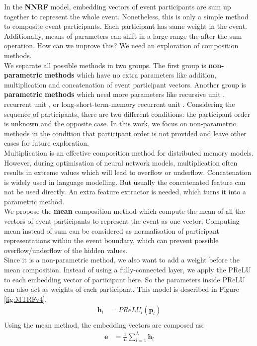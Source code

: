 \documentclass[a4paper]{article}
\begin{document}
In the \textbf{NNRF} model, embedding vectors of event participants are sum up together to represent the whole event. Nonetheless, this is only a simple method to composite event participants. Each participant has same weight in the event. Additionally, means of parameters can shift in a large range the after the sum operation. How can we improve this? We need an exploration of composition methods. \\
We separate all possible methods in two groups. The first group is \textbf{non-parametric methods} which have no extra parameters like addition, multiplication and concatenation of event participant vectors. Another group is \textbf{parametric methods} which need more parameters like recursive unit \citep{socher2013recursive}, recurrent unit \citet{mikolov2010recurrent}, or long-short-term-memory recurrent unit \citep{hochreiter1997LSTM}. Considering the sequence of participants, there are two different conditions: the participant order is unknown and the opposite case. In this work, we focus on non-parametric methods in the condition that participant order is not provided and leave other cases for future exploration. \\
\noindent
Multiplication is an effective composition method for distributed memory models. However, during optimisation of neural network models, multiplication often results in extreme values which will lead to overflow or underflow. Concatenation is widely used in language modelling. But usually the concatenated feature can not be used directly. An extra feature extractor is needed, which turns it into a parametric method. \\ 
\noindent
We propose the \textbf{mean} composition method which compute the mean of all the  vectors of event participants to represent the event as one vector. Computing mean instead of sum can be considered as normalisation of participant representations within the event boundary, which can prevent possible overflow/underflow of the hidden values. \\
Since it is a non-parametric method, we also want to add a weight before the mean composition. Instead of using a fully-connected layer, we apply the PReLU to each embedding vector of participant here. So the parameters inside PReLU can also act as weights of each participant. 
\noindent
This model is described in Figure \ref{fig:MTRFv4}. 
\begin{equation} \label{eq:nonlinearity}
\begin{aligned}
    \mathbf{h}_l
        &= PReLU_l(\mathbf{p}_l) \\
\end{aligned}
\end{equation}
\noindent
Using the mean method, the embedding vectors are composed as:
\begin{equation} \label{eq:mean_comp}
\begin{aligned}
    \mathbf{e}
        &= \frac{1}{L} \sum_{l=1}^{L} \mathbf{h}_{l} \\
\end{aligned}
\end{equation}
\end{document}
